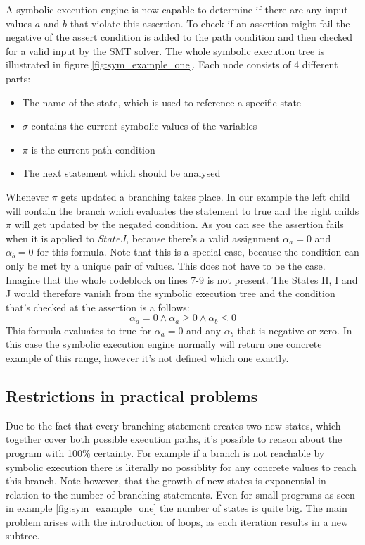 A symbolic execution engine is now capable to determine if there are any input values $a$  and $b$ that violate this assertion. To check if an assertion might fail the negative of the assert condition is added to the path condition and then checked for a valid input by the SMT solver. The whole symbolic execution tree is illustrated in figure \ref{fig:sym_example_one}. Each node consists of 4 different parts:
\begin{itemize}
\item The name of the state, which is used to reference a specific state
\item $\sigma$ contains the current symbolic values of the variables
\item $\pi$ is the current path condition
\item The next statement which should be analysed
\end{itemize}
Whenever $\pi$ gets updated a branching takes place. In our example the left child will contain the branch which evaluates the statement to true and the right childs $\pi$ will get updated by the negated condition.
As you can see the assertion fails when it is applied to $State J$, because there's a valid assignment $\alpha_a = 0$ and $\alpha_b = 0$ for this formula. Note that this is a special case, because the condition can only be met by a unique pair of values. This does not have to be the case. Imagine that the whole codeblock on lines 7-9 is not present. The States H, I and J would therefore vanish from the symbolic execution tree and the condition that's checked at the assertion is a follows:
$$\alpha_a  = 0 \land \alpha_a \geq 0 \land \alpha_b \leq 0$$
This formula evaluates to true for $\alpha_a = 0$  and any $\alpha_b$ that is negative or zero. In this case the symbolic execution engine normally will return one concrete example of this range, however it's not defined which one exactly. 
\subsection{Restrictions in practical problems}\label{section:symbolic_restrictions}
Due to the fact that every branching statement creates two new states, which together cover both possible execution paths, it's possible to reason about the program with 100\% certainty. For example if a branch is not reachable by symbolic execution there is literally no possiblity for any concrete values to reach this branch. Note however, that the growth of new states is exponential in relation to the number of branching statements. Even for small programs as seen in example \ref{fig:sym_example_one} the number of states is quite big. The main problem arises with the introduction of loops, as each iteration results in a new subtree.

